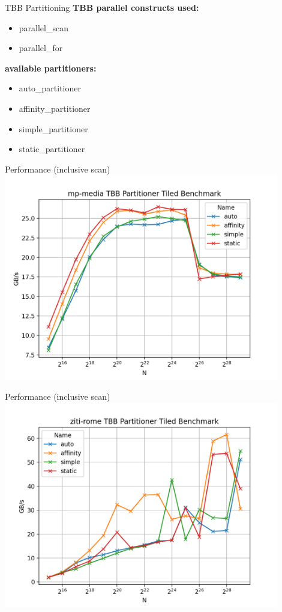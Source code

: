 \begin{frame}{TBB Partitioning} 
	\textbf{TBB parallel constructs used:}
	\begin{itemize}
		\item parallel\_scan
		\item parallel\_for
	\end{itemize}
	\vspace{.2in}
	\textbf{available partitioners:}
	\begin{itemize}
		\item auto\_partitioner
		\item affinity\_partitioner
		\item simple\_partitioner
		\item static\_partitioner
	\end{itemize}
\end{frame} 

\begin{frame}{Performance (inclusive scan)}
	\centering
	\vspace{-5pt}
	\includegraphics[width=0.90\textwidth]{"graphs/mp-media TBB Partitioner Tiled Benchmark"}
\end{frame}

\begin{frame}{Performance (inclusive scan)}
	\centering
	\vspace{-5pt}
	\includegraphics[width=0.90\textwidth]{"graphs/ziti-rome TBB Partitioner Tiled Benchmark.png"}
\end{frame}
